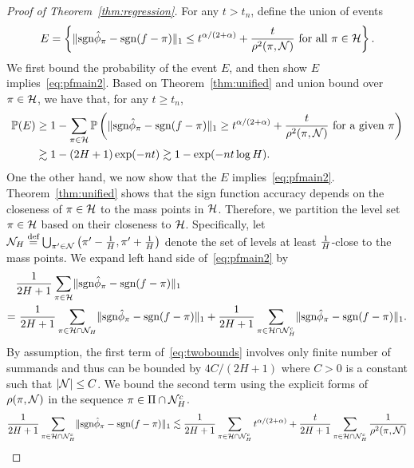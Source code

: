 \documentclass[11pt]{article}
\theoremstyle{plain}
\theoremstyle{definition}
\def\sign{\textup{sgn}}
\begin{document}
\begin{proof}[Proof of Theorem~\ref{thm:regression}]
For any $t>t_n$, define the union of events
\[
E=\left\{\onenormSize{}{\sign \hat \phi_\pi- \sign (f-\pi)} \leq t^{\alpha/(2+\alpha)}+{t\over \rho^2(\pi,\tN)} \text{ for all }\pi\in\tH\right\}.
\]
We first bound the probability of the event $E$, and then show $E$ implies~\eqref{eq:pfmain2}. Based on Theorem~\ref{thm:unified} and union bound over $\pi\in \mathcal{H}$, we have that, for any $t\geq t_n$,
\begin{align}\label{eq:joint}
\mathbb{P}(E) &\geq 1-\sum_{\pi\in\tH}\mathbb{P}\left( \onenormSize{}{\sign \hat \phi_\pi- \sign (f-\pi)} \geq t^{\alpha/(2+\alpha)}+{t\over \rho^2(\pi,\tN)} \text{ for a given }\pi \right)\\
&\gtrsim 1-(2H+1) \exp(-nt) \gtrsim 1-\exp(-nt\log H).
\end{align}
One the other hand, we now show that the $E$ implies~\eqref{eq:pfmain2}. Theorem~\ref{thm:unified} shows that the sign function accuracy depends on the closeness of $\pi\in \mathcal{H}$ to the mass points in $\mathcal{H}$. Therefore, we partition the level set $\pi \in \mathcal{H}$ based on their closeness to $\mathcal{H}$. Specifically, let $\mathcal{N}_H \stackrel{\text{def}}{=}\bigcup_{\pi'\in\mathcal{N}}\left(\pi'-\frac{1}{H},\pi'+\frac{1}{H}\right)$ denote the set of levels at least $1\over H$-close to the mass points. We expand left hand side of~\eqref{eq:pfmain2} by
\begin{align}\label{eq:twobounds}
&{1\over 2H+1}\sum_{\pi \in \tH}\onenormSize{}{\sign \hat \phi_\pi - \sign (f-\pi)} \notag \\
=& \ {1\over 2H+1}\sum_{\pi \in \tH \cap \tN_H} \onenormSize{}{\sign \hat \phi_\pi - \sign (f-\pi)} +{1\over 2H+1}\sum_{\pi \in \tH \cap \tN_H^c} \onenormSize{}{\sign \hat \phi_\pi - \sign (f-\pi)} .
\end{align}
By assumption, the first term of~\eqref{eq:twobounds} involves only finite number of summands and thus can be bounded by $4C/(2H + 1)$ where $C > 0$ is a constant such that $|\mathcal{N}|\leq C$. We bound the second term using the explicit forms of $\rho(\pi, \mathcal{N})$ in the sequence $\pi \in\Pi\cap \mathcal{N}_H^c$. 
\begin{align}
{1\over 2H+1}\sum_{\pi \in \tH\cap \tN_H^c} \onenormSize{}{\sign \hat \phi_\pi- \sign (f-\pi)} &\lesssim  {1\over 2H+1}\sum_{\pi\in \tH\cap \tN_H^c} t^{\alpha/(2+\alpha)}+{t\over 2H+1}\sum_{\pi \in \tH\cap \tN_H^c}{1\over \rho^2(\pi, \tN)}\\

\end{align}
\end{proof}
\end{document}
